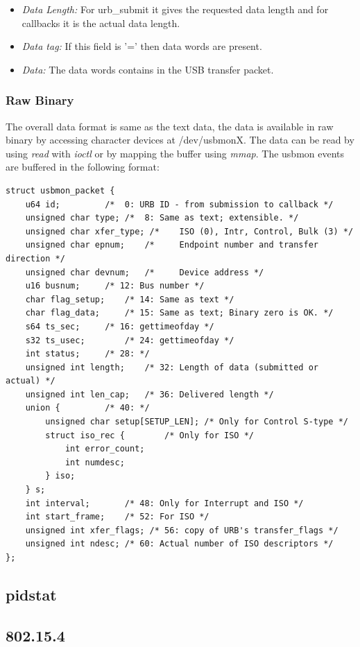 \begin{itemize}
\item{\textit{Data Length:} For urb\_submit it gives the requested data length and for callbacks it is the actual data length.}

\item{\textit{Data tag:} If this field is '=' then data words are present.}

\item{\textit{Data:} The data words contains in the USB transfer packet.}
\end{itemize}

\subsubsection{Raw Binary}
The overall data format is same as the text data, the data is available in raw binary by accessing character devices at /dev/usbmonX. The data can be read by using \textit{read} with \textit{ioctl} or by mapping the buffer using \textit{mmap}. The usbmon events are buffered in the following format:

\begingroup
\centering\scriptsize\begin{lstlisting}
struct usbmon_packet {
	u64 id;			/*  0: URB ID - from submission to callback */
	unsigned char type;	/*  8: Same as text; extensible. */
	unsigned char xfer_type; /*    ISO (0), Intr, Control, Bulk (3) */
	unsigned char epnum;	/*     Endpoint number and transfer direction */
	unsigned char devnum;	/*     Device address */
	u16 busnum;		/* 12: Bus number */
	char flag_setup;	/* 14: Same as text */
	char flag_data;		/* 15: Same as text; Binary zero is OK. */
	s64 ts_sec;		/* 16: gettimeofday */
	s32 ts_usec;		/* 24: gettimeofday */
	int status;		/* 28: */
	unsigned int length;	/* 32: Length of data (submitted or actual) */
	unsigned int len_cap;	/* 36: Delivered length */
	union {			/* 40: */
		unsigned char setup[SETUP_LEN];	/* Only for Control S-type */
		struct iso_rec {		/* Only for ISO */
			int error_count;
			int numdesc;
		} iso;
	} s;
	int interval;		/* 48: Only for Interrupt and ISO */
	int start_frame;	/* 52: For ISO */
	unsigned int xfer_flags; /* 56: copy of URB's transfer_flags */
	unsigned int ndesc;	/* 60: Actual number of ISO descriptors */
};	
\end{lstlisting}
\endgroup


\subsection{pidstat}
\subsection{802.15.4}